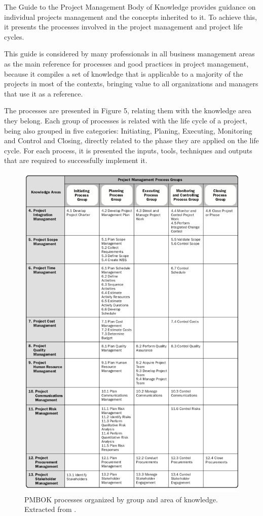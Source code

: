 The Guide to the Project Management Body of Knowledge provides guidance on individual projects management and the concepts inherited to it. To achieve this, it presents the processes involved in the project management and project life cycles\cite{pmbok5}.\par
This guide is considered by many professionals in all business management areas as the main reference for processes and good practices in project management, because it compiles a set of knowledge that is applicable to a majority of the projects in most of the contexts, bringing value to all organizations and managers that use it as a reference.\par 
The processes are presented in Figure 5, relating them with the knowledge area they belong. Each group of processes is related with the life cycle of a project, being also grouped in five categories: Initiating, Planing, Executing, Monitoring and Control and Closing, directly related to the phase they are applied on the life cycle. For each process, it is presented the inputs, tools, techniques and outputs that are required to successfully implement it.\par

\begin{figure}
\centering
\includegraphics[width=\textwidth]{img/PMBOKprocesses.png}
\caption{PMBOK processes organized by group and area of knowledge. Extracted from \cite{pmbok5}.}
\end{figure}


